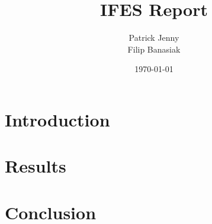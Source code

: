 \documentclass{report_class}
\title{IFES Report}
\author{Patrick Jenny\\Filip Banasiak}
\date{\today}
\begin{document}
	\maketitle
	
	
	\tableofcontents
	\newpage
	
	
	\newpage

	\clearpage
	
	\section{Introduction}
	

	\section{Results}
		
		\newpage

		
		\newpage

		
		\newpage

	\section{Conclusion}
	
	\newpage

	
	\newpage


	\listoftables
	\listoffigures
\end{document}
